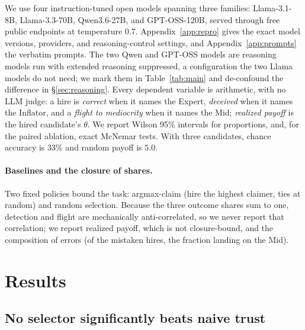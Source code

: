 \documentclass[11pt]{article}
\begin{document}
We use four instruction-tuned open models spanning three families: Llama-3.1-8B,
Llama-3.3-70B, Qwen3.6-27B, and GPT-OSS-120B, served through free public endpoints at
temperature 0.7. Appendix~\ref{app:repro} gives the exact model versions, providers, and
reasoning-control settings, and Appendix~\ref{app:prompts} the verbatim prompts. The two
Qwen and GPT-OSS models are reasoning models run with extended reasoning suppressed, a
configuration the two Llama models do not need; we mark them in
Table~\ref{tab:main} and de-confound the difference in \S\ref{sec:reasoning}.
Every dependent variable is arithmetic, with no LLM judge: a hire is
\emph{correct} when it names the Expert, \emph{deceived} when it names the Inflator, and a
\emph{flight to mediocrity} when it names the Mid; \emph{realized payoff} is the hired
candidate's $\theta$. We report Wilson 95\% intervals for proportions, and, for the paired ablation,
exact McNemar tests. With three candidates, chance accuracy is 33\% and random payoff is
$5.0$.

\paragraph{Baselines and the closure of shares.} Two fixed policies bound the task:
argmax-claim (hire the highest claimer, ties at random) and random selection.
Because the three outcome shares sum to one, detection and flight are mechanically
anti-correlated, so we never report that correlation; we report realized payoff, which
is not closure-bound, and the composition of errors (of the mistaken hires, the fraction
landing on the Mid).

\section{Results}
\label{sec:results}



\subsection{No selector significantly beats naive trust}
\end{document}
